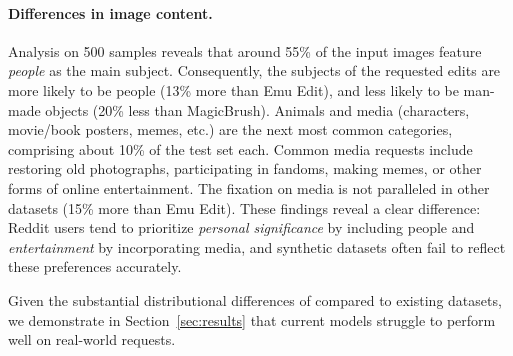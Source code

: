 \paragraph{Differences in image content.}  Analysis on 500 samples reveals that around 55\% of the input images feature \textit{people} as the main subject. Consequently, the subjects of the requested edits are more likely to be people (13\% more than Emu Edit), and less likely to be man-made objects (20\% less than MagicBrush).
Animals and media (characters, movie/book posters, memes, etc.) are the next most common categories, comprising about 10\% of the test set each. Common media requests include restoring old photographs, participating in fandoms, making memes, or other forms of online entertainment.
The fixation on media is not paralleled in other datasets (15\% more than Emu Edit). 
These findings reveal a clear difference: Reddit users tend to prioritize \textit{personal significance} by including people and \textit{entertainment} by incorporating media, and synthetic datasets often fail to reflect these preferences accurately.



Given the substantial distributional differences of \RealEdit compared to existing datasets, we demonstrate in Section~\ref{sec:results} that current models struggle to perform well on real-world requests.




